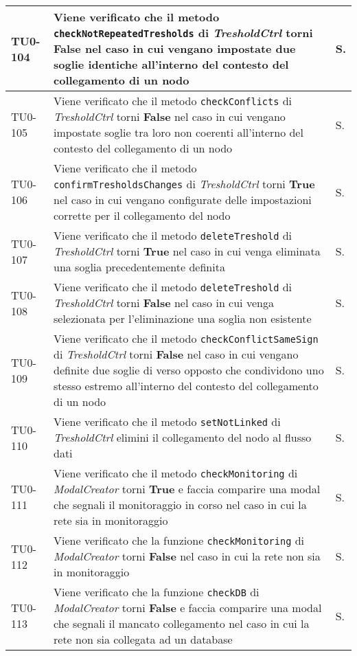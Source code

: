 \begin{longtable}{|C{.15\textwidth}|m{.66\textwidth}|C{.10\textwidth}|}
\hline
TU0-104 & Viene verificato che il metodo \texttt{checkNotRepeatedTresholds} di \textit{TresholdCtrl} torni \textbf{False} nel caso in cui vengano impostate due soglie identiche all'interno del contesto del collegamento di un nodo & S.\\
\hline
{}TU0-105 & Viene verificato che il metodo \texttt{checkConflicts} di \textit{TresholdCtrl} torni \textbf{False} nel caso in cui vengano impostate soglie tra loro non coerenti all'interno del contesto del collegamento di un nodo & S.\\
\hline
TU0-106 & Viene verificato che il metodo \texttt{confirmTresholdsChanges} di \textit{TresholdCtrl} torni \textbf{True} nel caso in cui vengano configurate delle impostazioni corrette per il collegamento del nodo & S.\\
\hline
{}TU0-107 & Viene verificato che il metodo \texttt{deleteTreshold} di \textit{TresholdCtrl} torni \textbf{True} nel caso in cui venga eliminata una soglia precedentemente definita & S.\\
\hline
TU0-108 & Viene verificato che il metodo \texttt{deleteTreshold} di \textit{TresholdCtrl} torni \textbf{False} nel caso in cui venga selezionata per l'eliminazione una soglia non esistente & S.\\
\hline
{}TU0-109 & Viene verificato che il metodo \texttt{checkConflictSameSign} di \textit{TresholdCtrl} torni \textbf{False} nel caso in cui vengano definite due soglie di verso opposto che condividono uno stesso estremo all'interno del contesto del collegamento di un nodo & S.\\
\hline
TU0-110 & Viene verificato che il metodo \texttt{setNotLinked} di \textit{TresholdCtrl} elimini il collegamento del nodo al flusso dati & S.\\
\hline
{}TU0-111 & Viene verificato che il metodo \texttt{checkMonitoring} di \textit{ModalCreator} torni \textbf{True} e faccia comparire una modal che segnali il monitoraggio in corso nel caso in cui la rete sia in monitoraggio & S. \\
\hline
TU0-112 & Viene verificato che la funzione \texttt{checkMonitoring} di \textit{ModalCreator} torni \textbf{False} nel caso in cui la rete non sia in monitoraggio & S. \\
\hline
{}TU0-113 & Viene verificato che la funzione \texttt{checkDB} di \textit{ModalCreator} torni \textbf{False} e faccia comparire una modal che segnali il mancato collegamento nel caso in cui la rete non sia collegata ad un database & S. \\

\end{longtable}
